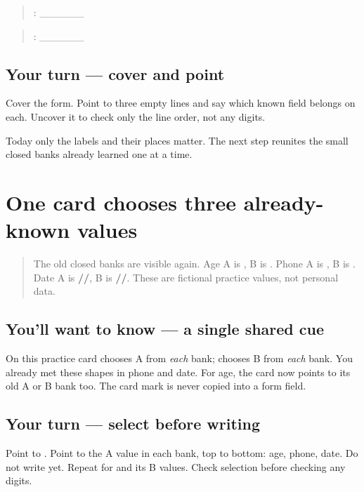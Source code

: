 \begin{quote}
: \_\_\_\_\_\_
\end{quote}

\begin{quote}
: \_\_\_\_\_\_
\end{quote}

\subsection*{Your turn — cover and point}
Cover the form. Point to three empty lines and say which known field belongs on each. Uncover it to check only the line order, not any digits.

\begin{tcolorbox}[breakable,colback=teal!4,colframe=teal!35!black,title={Before you move on}]
Today only the labels and their places matter. The next step reunites the small closed banks already learned one at a time.
\end{tcolorbox}
\section[\texorpdfstring{\pa{ਕ} / \pa{ਖ} (two fictional cards)}{ਕ / ਖ (two fictional cards)}]{One card chooses three already-known values}

\label{lesson:PA-W10-form-select}



\begin{quote}
The old closed banks are visible again. Age A is \textbf{}, B is \textbf{}. Phone A is \textbf{ }, B is \textbf{ }. Date A is \textbf{//}, B is \textbf{//}. These are fictional practice values, not personal data.
\end{quote}

\subsection*{You'll want to know — a single shared cue}
On this practice card \textbf{} chooses A from \emph{each} bank; \textbf{} chooses B from \emph{each} bank. You already met these shapes in phone and date. For age, the card now points to its old A or B bank too. The card mark is never copied into a form field.

\subsection*{Your turn — select before writing}
Point to \textbf{}. Point to the A value in each bank, top to bottom: age, phone, date. Do not write yet. Repeat for \textbf{} and its B values. Check selection before checking any digits.

